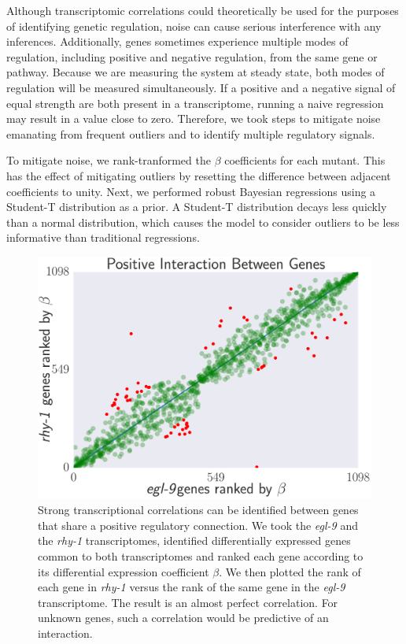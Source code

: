 \documentclass[9pt,twocolumn,twoside]{pnas-new}
\newcommand{\egl}{\emph{egl-9}}
\newcommand{\rhy}{\emph{rhy-1}}
\begin{document}
Although transcriptomic correlations could theoretically be used for the purposes of identifying genetic regulation, noise can cause serious interference with any inferences. Additionally, genes sometimes experience multiple modes of regulation, including positive and negative regulation, from the same gene or pathway. Because we are measuring the system at steady state, both modes of regulation will be measured simultaneously. If a positive and a negative signal of equal strength are both present in a transcriptome, running a naive regression may result in a value close to zero.
Therefore, we took steps to mitigate noise emanating from frequent outliers and to identify multiple regulatory signals.

To mitigate noise, we rank-tranformed the $\beta$ coefficients for each mutant. This has the effect of mitigating outliers by resetting the difference between adjacent coefficients to unity. Next, we performed robust Bayesian regressions using a Student-T distribution as a prior. A Student-T distribution decays less quickly than a normal distribution, which causes the model to consider outliers to be less informative than traditional regressions.

\begin{figure}%
\centering
\includegraphics[width=\linewidth]{figs/correlative_genetics.pdf}
\caption{Strong transcriptional correlations can be identified between genes that share a positive regulatory connection. We took the \egl{} and the \rhy{} transcriptomes, identified differentially expressed genes common to both transcriptomes and ranked each gene according to its differential expression coefficient $\beta$. We then plotted the rank of each gene in \rhy{} versus the rank of the same gene in the \egl{} transcriptome. The result is an almost perfect correlation. For unknown genes, such a correlation would be predictive of an interaction.}
\label{fig:genetic_interactions}
\end{figure}
\end{document}
